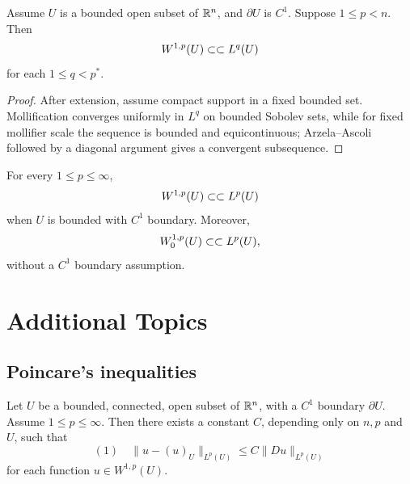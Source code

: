 \begin{theorem}
\label{thm:rellich-kondrachov}

Assume $U$ is a bounded open subset of $\mathbb{R}^n$, and $\partial U$ is $C^1$. Suppose $1 \le p < n$. Then
$$W^{1,p}(U) \subset\subset L^q(U)$$
for each $1 \le q < p^*$.
\end{theorem}

\begin{proof}
\sketch After extension, assume compact support in a fixed bounded set. Mollification converges uniformly in $L^q$ on bounded Sobolev sets, while for fixed mollifier scale the sequence is bounded and equicontinuous; Arzela--Ascoli followed by a diagonal argument gives a convergent subsequence.
\end{proof}

\begin{remark}
\label{rem:compact-embedding-lp-all-p}

For every $1\le p\le\infty$,
$$W^{1,p}(U) \subset\subset L^p(U)$$
when $U$ is bounded with $C^1$ boundary. Moreover,
$$W_0^{1,p}(U) \subset\subset L^p(U),$$
without a $C^1$ boundary assumption.
\end{remark}

\section{Additional Topics}
\label{sec:sobolev-additional-topics}

\subsection{Poincare's inequalities}

\begin{theorem}
\label{thm:poincares-inequality-connected}

Let $U$ be a bounded, connected, open subset of $\mathbb{R}^n$, with a $C^1$ boundary $\partial U$. Assume $1 \le p \le \infty$. Then there exists a constant $C$, depending only on $n,p$ and $U$, such that
$$(1) \quad \|u - (u)_U\|_{L^p(U)} \le C\|Du\|_{L^p(U)}$$
for each function $u \in W^{1,p}(U)$.
\end{theorem}

